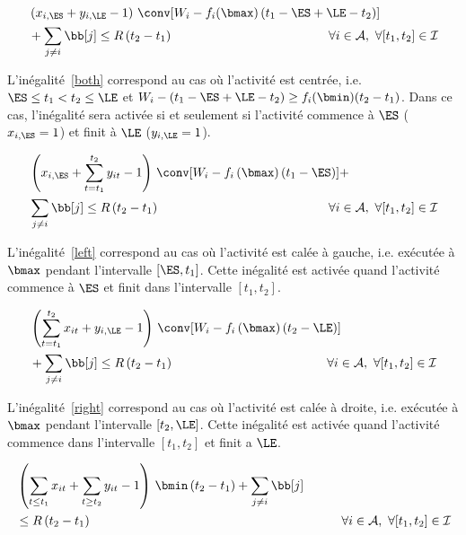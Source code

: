 \begin{align}
&\left(x_{i,\ES} + y_{i,\LE} -1 \right) \, \conv[W_i-f_i(\bmax)\left(t_1-\ES + \LE
-t_2\right)] \nonumber \\
&+ \sum_{j\neq i} \bb[j] \le R\left(t_2-t_1\right) \hspace{4.35cm} \forall i \in
{\cal A},\ \forall [t_1,t_2] \in \I  \label{both}
\end{align}

L'inégalité~\eqref{both} correspond au cas où l'activité est centrée,
i.e. $\ES\le t_1<t_2 \le \LE$ et $W_i-\left(t_1-\ES + \LE -t_2\right)
\ge f_i(\bmin)(t_2-t_1)$. Dans ce cas, l'inégalité sera activée si et
seulement si l'activité commence à $\ES$ ($x_{i,\ES}=1$) et finit à
$\LE$ ($y_{i,\LE}=1$). 

\begin{align}
&\left(x_{i,\ES} + \sum_{t=t_1}^{t_2}y_{it} -1\right) \,
\conv[W_i-f_i\left(\bmax\right)\left(t_1-\ES\right)]+ \nonumber\\
&\sum_{j\neq i} \bb[j] \le R\left(t_2-t_1\right) \hspace{4.75cm} \forall i \in
  {\cal A},\ \forall [t_1,t_2] \in \I
\label{left}
\end{align}

L'inégalité~\eqref{left} correspond au cas où l'activité est calée à
gauche, i.e. exécutée à $\bmax$ pendant l'intervalle
$[\ES,t_1]$. Cette inégalité est activée quand l'activité commence à
$\ES$ et finit dans l'intervalle $[t_1,t_2]$. 

\begin{align}
&\left(\sum_{t=t_1}^{t_2}x_{it} + y_{i,\LE}-1\right) \,
\conv[W_i-f_i\left(\bmax\right)\left(t_2-\LE\right)]\nonumber\\
& + \sum_{j\neq i} \bb[j] \le R\left(t_2-t_1\right) \hspace{4.29cm} \forall i \in
{\cal A},\ \forall [t_1,t_2] \in \I
\label{right}
\end{align} 

L'inégalité~\eqref{right} correspond au cas où l'activité est calée à
droite, i.e. exécutée à $\bmax$ pendant l'intervalle
$[t_2,\LE]$. Cette inégalité est activée quand l'activité commence
dans l'intervalle $[t_1,t_2]$ et finit a $\LE$.

\begin{align}
&\left(\sum_{t\le t_1}x_{it} + \sum_{t\ge t_2}y_{it} -1 \right) \,
  \bmin\left(t_2-t_1\right) + \sum_{j\neq i} \bb[j] \nonumber\\
& \le R\left(t_2-t_1\right)\hspace{7cm} \forall i \in {\cal A},\ \forall [t_1,t_2]
\in \I
\label{min}
\end{align}

